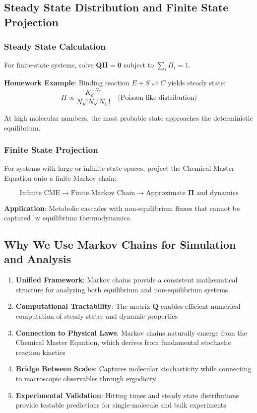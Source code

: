 \documentclass[12pt]{article}
\begin{document}
\subsection{Steady State Distribution and Finite State Projection}

\subsubsection{Steady State Calculation}

For finite-state systems, solve $\mathbf{Q}\boldsymbol{\Pi} = \mathbf{0}$ subject to $\sum_i \Pi_i = 1$.

\textbf{Homework Example}: Binding reaction $E + S \rightleftharpoons C$ yields steady state:
\begin{equation}
    \Pi \propto \frac{K_d^{-N_C}}{N_E! N_S! N_C!} \quad \text{(Poisson-like distribution)}
\end{equation}

At high molecular numbers, the most probable state approaches the deterministic equilibrium.

\subsubsection{Finite State Projection}

For systems with large or infinite state spaces, project the Chemical Master Equation onto a finite Markov chain:

\begin{equation}
    \text{Infinite CME} \rightarrow \text{Finite Markov Chain} \rightarrow \text{Approximate } \boldsymbol{\Pi} \text{ and dynamics}
\end{equation}

\textbf{Application}: Metabolic cascades with non-equilibrium fluxes that cannot be captured by equilibrium thermodynamics.

\subsection{Why We Use Markov Chains for Simulation and Analysis}

\begin{enumerate}
    \item \textbf{Unified Framework}: Markov chains provide a consistent mathematical structure for analyzing both equilibrium and non-equilibrium systems
    \item \textbf{Computational Tractability}: The matrix $\mathbf{Q}$ enables efficient numerical computation of steady states and dynamic properties
    \item \textbf{Connection to Physical Laws}: Markov chains naturally emerge from the Chemical Master Equation, which derives from fundamental stochastic reaction kinetics
    \item \textbf{Bridge Between Scales}: Captures molecular stochasticity while connecting to macroscopic observables through ergodicity
    \item \textbf{Experimental Validation}: Hitting times and steady state distributions provide testable predictions for single-molecule and bulk experiments
\end{enumerate}
\end{document}
